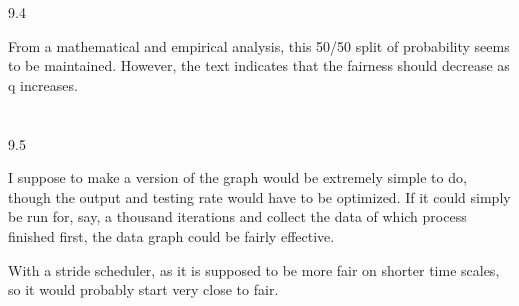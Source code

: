 \documentclass[12pt, a4paper]{article}
\begin{document}
9.4

From a mathematical and empirical analysis, this 50/50 split of probability seems to be maintained. However, the text indicates that the fairness should decrease as q increases.\\ \\ \\

9.5

I suppose to make a version of the graph would be extremely simple to do, though the output and testing rate would have to be optimized. If it could simply be run for, say, a thousand iterations and collect the data of which process finished first, the data graph could be fairly effective.

With a stride scheduler, as it is supposed to be more fair on shorter time scales, so it would probably start very close to fair.
\end{document}
